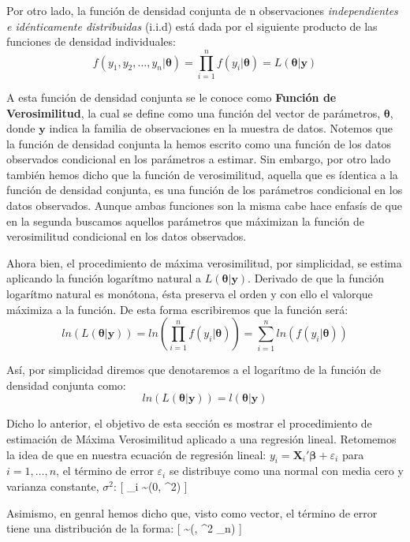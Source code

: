 \documentclass[
  a4paper,
]{article}
\begin{document}
Por otro lado, la función de densidad conjunta de n observaciones
\textit{independientes e idénticamente distribuidas} (i.i.d) está dada
por el siguiente producto de las funciones de densidad individuales: \[
f(y_1, y_2, \ldots, y_n |\boldsymbol{\theta}) = \prod_{i=1}^n f(y_i|\boldsymbol{\theta}) = L(\boldsymbol{\theta} | \boldsymbol{y})
\]

A esta función de densidad conjunta se le conoce como
\textbf{Función de Verosimilitud}, la cual se define como una función
del vector de parámetros, \(\boldsymbol{\theta}\), donde
\(\boldsymbol{y}\) indica la familia de observaciones en la muestra de
datos. Notemos que la función de densidad conjunta la hemos escrito como
una función de los datos observados condicional en los parámetros a
estimar. Sin embargo, por otro lado también hemos dicho que la función
de verosimilitud, aquella que es ídentica a la función de densidad
conjunta, es una función de los parámetros condicional en los datos
observados. Aunque ambas funciones son la misma cabe hace enfasís de que
en la segunda buscamos aquellos parámetros que máximizan la función de
verosimilitud condicional en los datos observados.

Ahora bien, el procedimiento de máxima verosimilitud, por simplicidad,
se estima aplicando la función logarítmo natural a
\(L(\boldsymbol{\theta} | \boldsymbol{y})\). Derivado de que la función
logarítmo natural es monótona, ésta preserva el orden y con ello el
valorque máximiza a la función. De esta forma escribiremos que la
función será: \[
ln(L(\boldsymbol{\theta} | \boldsymbol{y})) = ln(\prod_{i=1}^n f(y_i|\boldsymbol{\theta})) = \sum_{i = 1}^{n} ln(f(y_i|\boldsymbol{\theta}))
\]

Así, por simplicidad diremos que denotaremos a el logarítmo de la
función de densidad conjunta como: \[
ln(L(\boldsymbol{\theta} | \boldsymbol{y})) = l(\boldsymbol{\theta} | \boldsymbol{y})
\]

Dicho lo anterior, el objetivo de esta sección es mostrar el
procedimiento de estimación de Máxima Verosimilitud aplicado a una
regresión lineal. Retomemos la idea de que en nuestra ecuación de
regresión lineal:
\(y_i = \mathbf{X}_i'\boldsymbol \beta + \varepsilon_i\) para
\(i = 1, \ldots, n\), el término de error \(\varepsilon_i\) se
distribuye como una normal con media cero y varianza constante,
\(\sigma^2\): {[} \varepsilon\_i \sim {}(0, \sigma\^{}2) {]}

Asimismo, en genral hemos dicho que, visto como vector, el término de
error tiene una distribución de la forma: {[}
\boldsymbol \varepsilon \sim {}(, \sigma\^{}2
\_n) {]}
\end{document}
